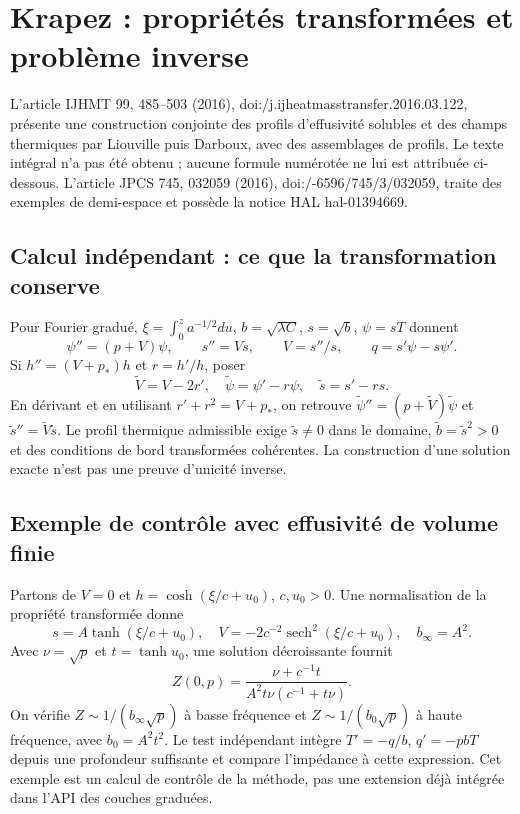 \documentclass[11pt,a4paper]{article}
\begin{document}
\section{Krapez : propriétés transformées et problème inverse}
L'article IJHMT 99, 485--503 (2016),
doi:/\allowbreak j.ijheatmasstransfer.2016.03.122,
présente une construction conjointe des profils d'effusivité solubles et des
champs thermiques par Liouville puis Darboux, avec des assemblages de profils.
Le texte intégral n'a pas été obtenu ; aucune formule numérotée ne lui est
attribuée ci-dessous. L'article JPCS 745, 032059 (2016),
doi:/-6596/745/3/032059,
traite des exemples de demi-espace et possède la notice HAL hal-01394669.

\subsection{Calcul indépendant : ce que la transformation conserve}
Pour Fourier gradué, $\xi=\int_0^z a^{-1/2}du$,
$b=\sqrt{\lambda C}$, $s=\sqrt b$, $\psi=sT$ donnent
\[
 \psi''=(p+V)\psi,\qquad s''=Vs,\qquad V=s''/s,\qquad
 q=s'\psi-s\psi'.
\]
Si $h''=(V+p_*)h$ et $r=h'/h$, poser
\[
 \widetilde V=V-2r',\quad
 \widetilde\psi=\psi'-r\psi,\quad
 \widetilde s=s'-rs .
\]
En dérivant et en utilisant $r'+r^2=V+p_*$, on retrouve
$\widetilde\psi''=(p+\widetilde V)\widetilde\psi$ et
$\widetilde s''=\widetilde V\widetilde s$.
Le profil thermique admissible exige $\widetilde s\ne0$ dans le domaine,
$\widetilde b=\widetilde s^2>0$ et des conditions de bord transformées cohérentes.
La construction d'une solution exacte n'est pas une preuve d'unicité inverse.

\subsection{Exemple de contrôle avec effusivité de volume finie}
Partons de $V=0$ et $h=\cosh(\xi/c+u_0)$, $c,u_0>0$.
Une normalisation de la propriété transformée donne
\[
 s=A\tanh(\xi/c+u_0),\quad
 V=-2c^{-2}\operatorname{sech}^2(\xi/c+u_0),\quad
 b_\infty=A^2 .
\]
Avec $\nu=\sqrt p$ et $t=\tanh u_0$, une solution décroissante fournit
\[
 Z(0,p)=\frac{\nu+c^{-1}t}
 {A^2t\nu(c^{-1}+t\nu)} .
\]
On vérifie $Z\sim1/(b_\infty\sqrt p)$ à basse fréquence et
$Z\sim1/(b_0\sqrt p)$ à haute fréquence, avec $b_0=A^2t^2$.
Le test indépendant intègre $T'=-q/b$, $q'=-pbT$ depuis une profondeur
suffisante et compare l'impédance à cette expression.
Cet exemple est un calcul de contrôle de la méthode, pas une extension
déjà intégrée dans l'API des couches graduées.
\end{document}
